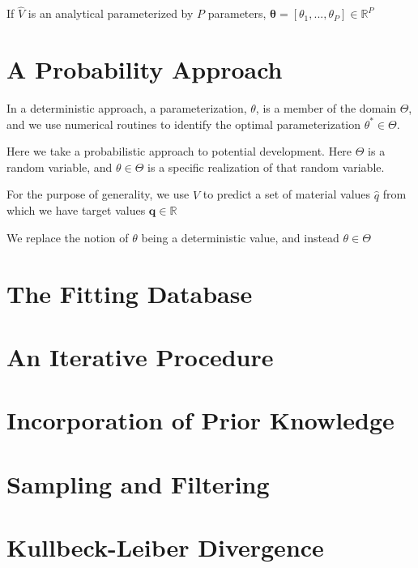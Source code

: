 If $\hat{V}$ is an analytical parameterized by $P$ parameters, $\bm{\theta}=[\theta_1,...,\theta_P]\in\mathbb{R}^P$

\section{A Probability Approach}

In a deterministic approach, a parameterization, $\theta$, is a member of the domain $\Theta$, and we use numerical routines to identify the optimal parameterization $\theta^*\in\Theta$.

Here we take a probabilistic approach to potential development.
Here $\Theta$ is a random variable, and $\theta\in\Theta$ is a specific realization of that random variable.

For the purpose of generality, we use $\hat{V}$ to predict a set of material values $\hat{q}$ from which we have target values $\bm{q}\in\mathbb{R}$


We replace the notion of $\theta$ being a deterministic value, and instead $\theta\in\Theta$

\section{The Fitting Database}

\section{An Iterative Procedure}

\section{Incorporation of Prior Knowledge}

\section{Sampling and Filtering}

\section{Kullbeck-Leiber Divergence}

